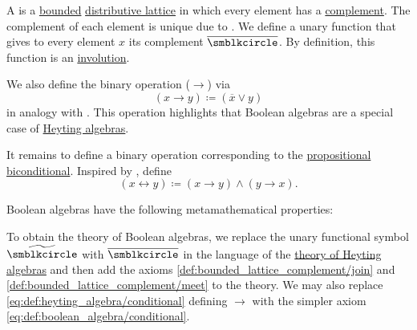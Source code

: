 \begin{definition}\label{def:boolean_algebra}
  A  is a \hyperref[def:semilattice/bounded]{bounded} \hyperref[def:semilattice/distributive_lattice]{distributive lattice} in which every element has a \hyperref[def:bounded_lattice_complement]{complement}. The complement of each element is unique due to . We define a unary function that gives to every element \( x \) its complement \( \overline \anon \). By definition, this function is an \hyperref[def:set_with_involution]{involution}.

  \begin{thmenum}[series=def:boolean_algebra]
     We also define the binary operation  (\( \rightarrow \)) via
    \begin{equation}\label{eq:def:boolean_algebra/conditional}
      (x \rightarrow y) \coloneqq (\overline x \vee y)
    \end{equation}
    in analogy with . This operation highlights that Boolean algebras are a special case of \hyperref[thm:boolean_algebras_are_heyting_algebras]{Heyting algebras}.

     It remains to define a binary operation corresponding to the \hyperref[def:propositional_language/connectives/biconditional]{propositional biconditional}. Inspired by , define
    \begin{equation}\label{eq:def:boolean_algebra/biconditional}
      (x \leftrightarrow y) \coloneqq (x \rightarrow y) \wedge (y \rightarrow x).
    \end{equation}
  \end{thmenum}

  Boolean algebras have the following metamathematical properties:
  \begin{thmenum}[resume=def:boolean_algebra]
     To obtain the theory of Boolean algebras, we replace the unary functional symbol \( \widetilde{\anon} \) with \( \overline \anon \) in the language of the \hyperref[def:heyting_algebra/theory]{theory of Heyting algebras} and then add the axioms \eqref{def:bounded_lattice_complement/join} and \eqref{def:bounded_lattice_complement/meet} to the theory. We may also replace \eqref{eq:def:heyting_algebra/conditional} defining \( \rightarrow \) with the simpler axiom \eqref{eq:def:boolean_algebra/conditional}.


\end{thmenum}
\end{definition}
